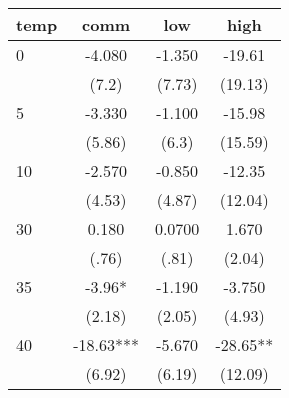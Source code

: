 \documentclass[]{article}
\begin{document}
\begin{tabular}{lccc} \hline
temp & comm & low & high \\ \hline
0 & -4.080 & -1.350 & -19.61 \\
 & (7.2) & (7.73) & (19.13) \\
5 & -3.330 & -1.100 & -15.98 \\
 & (5.86) & (6.3) & (15.59) \\
10 & -2.570 & -0.850 & -12.35 \\
 & (4.53) & (4.87) & (12.04) \\
30 & 0.180 & 0.0700 & 1.670 \\
 & (.76) & (.81) & (2.04) \\
35 & -3.96* & -1.190 & -3.750 \\
 & (2.18) & (2.05) & (4.93) \\
40 & -18.63*** & -5.670 & -28.65** \\
 & (6.92) & (6.19) & (12.09) \\ \hline
\end{tabular}
\end{document}
